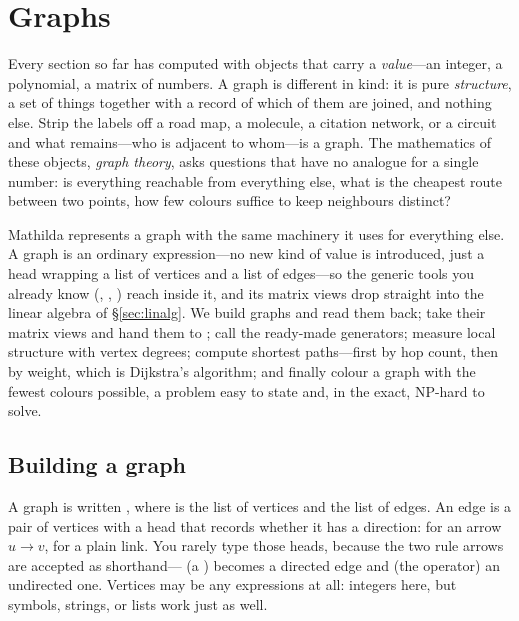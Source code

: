 \section{Graphs}
\label{sec:graphs}

Every section so far has computed with objects that carry a \emph{value}---an
integer, a polynomial, a matrix of numbers. A graph is different in kind: it is
pure \emph{structure}, a set of things together with a record of which of them
are joined, and nothing else. Strip the labels off a road map, a molecule, a
citation network, or a circuit and what remains---who is adjacent to
whom---is a graph. The mathematics of these objects, \emph{graph theory}, asks
questions that have no analogue for a single number: is everything reachable
from everything else, what is the cheapest route between two points, how few
colours suffice to keep neighbours distinct?

Mathilda represents a graph with the same machinery it uses for everything
else. A graph is an ordinary expression---no new kind of value is introduced,
just a head  wrapping a list of vertices and a list of edges---so the
generic tools you already know (, , ) reach inside
it, and its matrix views drop straight into the linear algebra of
\S\ref{sec:linalg}. We build graphs and read them back; take their matrix views
and hand them to ; call the ready-made generators; measure local
structure with vertex degrees; compute shortest paths---first by hop count, then
by weight, which is Dijkstra's algorithm; and finally colour a graph with the
fewest colours possible, a problem easy to state and, in the exact, NP-hard to
solve.

\subsection{Building a graph}
\label{ssec:graph-construct}

A graph is written \mcode{[v, e]}, where  is the list of
vertices and  the list of edges. An edge is a pair of vertices with a
head that records whether it has a direction:  for an
arrow \(u \to v\),  for a plain link. You rarely
type those heads, because the two rule arrows are accepted as
shorthand--- (a ) becomes a directed edge and
 (the  operator) an undirected
one. Vertices
may be any expressions at all: integers here, but symbols, strings, or lists
work just as well.


